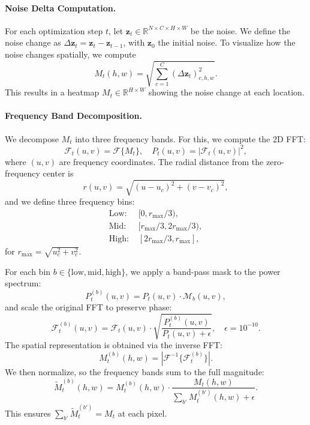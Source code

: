 \documentclass[10pt,twocolumn,letterpaper]{article}
\begin{document}
\paragraph{Noise Delta Computation.}
For each optimization step $t$, let $\mathbf{z}_t \in \mathbb{R}^{N \times C \times H \times W}$ be the noise.  
We define the noise change as
   $ \Delta \mathbf{z}_t = \mathbf{z}_t - \mathbf{z}_{t-1}$,
with $\mathbf{z}_0$ the initial noise.
To visualize how the noise changes spatially, we compute
\begin{equation}
    M_t(h, w) = \sqrt{\sum_{c=1}^{C} \left( \Delta \mathbf{z}_t \right)_{c,h,w}^2 }.
\end{equation}
This results in a heatmap $M_t \in \mathbb{R}^{H \times W}$ showing the noise change at each location.

\paragraph{Frequency Band Decomposition.}
We decompose $M_t$ into three frequency bands. For this, we compute the 2D FFT:
\begin{equation*}
\mathcal{F}_t(u,v) = \mathcal{F}\{M_t\}, \quad P_t(u,v) = |\mathcal{F}_t(u,v)|^2,
\end{equation*}
where $(u,v)$ are frequency coordinates. The radial distance from the zero-frequency center is
\begin{equation}
r(u,v) = \sqrt{(u-u_c)^2 + (v-v_c)^2}, 
\end{equation}
and we define three frequency bins:
\begin{align*}
\text{Low: }& [0, r_{\max}/3),\\
\text{Mid: }& [r_{\max}/3, 2 r_{\max}/3), \\
\text{High: }& [2 r_{\max}/3, r_{\max}],
\end{align*}
for $r_{\max} = \sqrt{u_c^2 + v_c^2}$.

For each bin $b \in \{\text{low}, \text{mid}, \text{high}\}$, we apply a band-pass mask to the power spectrum:
\begin{equation}
P_t^{(b)}(u,v) = P_t(u,v) \cdot \mathcal{M}_b(u,v),
\end{equation}
and scale the original FFT to preserve phase:
\begin{equation}
\mathcal{F}_t^{(b)}(u,v) = \mathcal{F}_t(u,v) \cdot \sqrt{\frac{P_t^{(b)}(u,v)}{P_t(u,v) + \epsilon}}, \quad \epsilon = 10^{-10}.
\end{equation}
The spatial representation is obtained via the inverse FFT:
\begin{equation}
M_t^{(b)}(h,w) = \left|\mathcal{F}^{-1}\{\mathcal{F}_t^{(b)}\}\right|.
\end{equation}
We then normalize, so the frequency bands sum to the full magnitude:
\begin{equation}
    \tilde{M}_t^{(b)}(h,w) = M_t^{(b)}(h,w) \cdot \frac{M_t(h,w)}{\sum_{b'} M_t^{(b')}(h,w) + \epsilon}.
\end{equation}
This ensures $\sum_{b'} \tilde{M}_t^{(b')} = M_t$ at each pixel.
\end{document}
